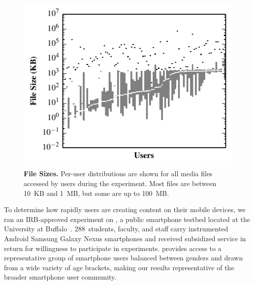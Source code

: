 \begin{figure}[t]


\includegraphics{./figures/pocketlocker/FileSizeDistributionGraph.pdf}


\caption{\small \textbf{File Sizes.} Per-user distributions are shown for all
media files accessed by users during the experiment. Most files
are between 10~KB and 1~MB, but some are up to 100~MB.}

\label{fig-motivation-totals}


\end{figure}
To determine how rapidly users are creating content on their mobile devices,
we ran an IRB-approved experiment on \PhoneLab{}, a public smartphone testbed
located at the University at Buffalo~\cite{nandugudi2013phonelab}.
288~students, faculty, and staff carry instrumented Android Samsung Galaxy
Nexus smartphones and received subsidized service in return for willingness
to participate in experiments. \PhoneLab{} provides access to a
representative group of smartphone users balanced between genders and drawn
from a wide variety of age brackets, making our results representative of the
broader smartphone user community.

